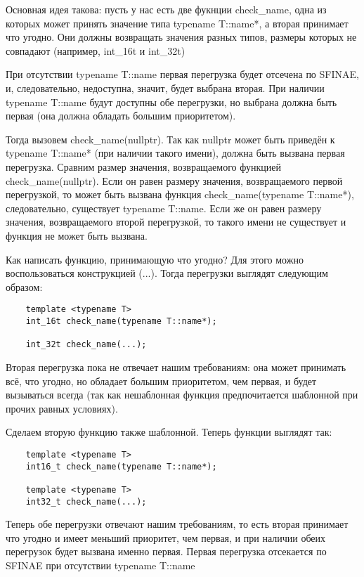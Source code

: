 	Основная идея такова: пусть у нас есть две фукнции check\_name, одна из которых может принять значение типа typename T::name*, а вторая принимает что угодно. Они должны возвращать значения разных типов, размеры которых не совпадают (например, int\_16t и int\_32t)
	
	При отсутствии typename T::name первая перегрузка будет отсечена по SFINAE, и, следовательно, недоступна, значит, будет выбрана вторая. При наличии typename T::name будут доступны обе перегрузки, но выбрана должна быть первая (она должна обладать большим приоритетом). 

	Тогда вызовем check\_name(nullptr). Так как nullptr может быть приведён к typename T::name* (при наличии такого имени), должна быть вызвана первая перегрузка. Сравним размер значения, возвращаемого функцией check\_name(nullptr). Если он равен размеру значения, возвращаемого первой перегрузкой, то может быть вызвана функция check\_name(typename T::name*), следовательно, существует typename T::name. Если же он равен размеру значения, возвращаемого второй перегрузкой, то такого имени не существует и функция не может быть вызвана.
	
	Как написать функцию, принимающую что угодно? Для этого можно воспользоваться конструкцией (...). Тогда перегрузки выглядят следующим образом:

	\begin{verbatim}
	template <typename T>
	int_16t check_name(typename T::name*);

	int_32t check_name(...);
	\end{verbatim}
	
	Вторая перегрузка пока не отвечает нашим требованиям: она может принимать всё, что угодно, но обладает большим приоритетом, чем первая, и будет вызываться всегда (так как нешаблонная функция предпочитается шаблонной при прочих равных условиях).

	Сделаем вторую функцию также шаблонной. Теперь функции выглядят так:
	
	\begin{verbatim}
	template <typename T>
	int16_t check_name(typename T::name*);
	
	template <typename T>
	int32_t check_name(...);
	\end{verbatim}
	
	Теперь обе перегрузки отвечают нашим требованиям, то есть вторая принимает что угодно и имеет меньший приоритет, чем первая, и при наличии обеих перегрузок будет вызвана именно первая. Первая перегрузка отсекается по SFINAE при отсутствии typename T::name
	
